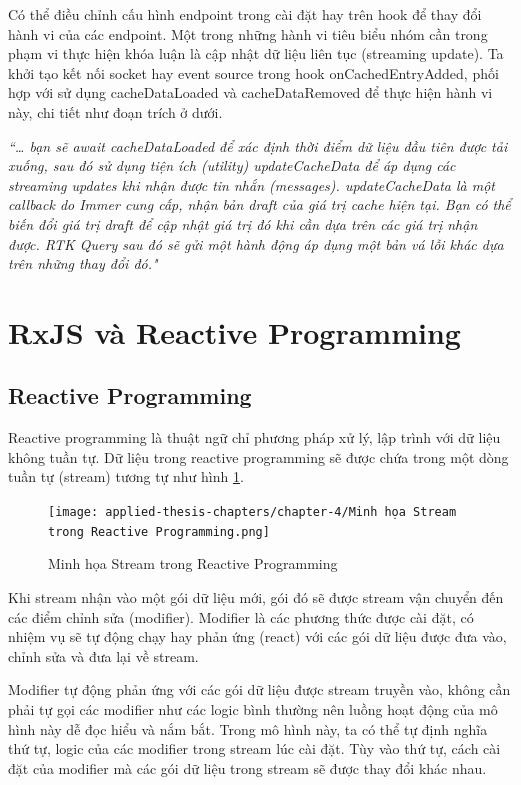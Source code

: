 Có thể điều chỉnh cấu hình endpoint trong cài đặt hay trên hook để thay đổi hành vi của các endpoint.
Một trong những hành vi tiêu biểu nhóm cần trong phạm vi thực hiện khóa luận là cập nhật dữ liệu liên tục (streaming update).
Ta khởi tạo kết nối socket hay event source trong hook onCachedEntryAdded, phối hợp với sử dụng cacheDataLoaded và cacheDataRemoved để thực hiện hành vi này, chi tiết như đoạn trích ở dưới.
\par

\textit{“… bạn sẽ await cacheDataLoaded để xác định thời điểm dữ liệu đầu tiên được tải xuống, sau đó sử dụng tiện ích (utility) updateCacheData để áp dụng các streaming updates khi nhận được tin nhắn (messages).
  updateCacheData là một callback do Immer cung cấp, nhận bản draft của giá trị cache hiện tại.
  Bạn có thể biến đổi giá trị draft để cập nhật giá trị đó khi cần dựa trên các giá trị nhận được.
  RTK Query sau đó sẽ gửi một hành động áp dụng một bản vá lỗi khác dựa trên những thay đổi đó."} \cite{chap4bib3}

\section{RxJS và Reactive Programming}

\subsection{Reactive Programming}

\tab Reactive programming là thuật ngữ chỉ phương pháp xử lý, lập trình với dữ liệu không tuần tự.
Dữ liệu trong reactive programming sẽ được chứa trong một dòng tuần tự (stream) tương tự như hình \ref{fig:StreamInRP}.

\begin{figure}[H]
  \centering
  \texttt{[image: applied-thesis-chapters/chapter-4/Minh họa Stream trong Reactive Programming.png]}
  \caption{Minh họa Stream trong Reactive Programming \cite{chap4bib4}}
  \label{fig:StreamInRP}
\end{figure}

Khi stream nhận vào một gói dữ liệu mới, gói đó sẽ được stream vận chuyển đến các điểm chỉnh sửa (modifier).
Modifier là các phương thức được cài đặt, có nhiệm vụ sẽ tự động chạy hay phản ứng (react) với các gói dữ liệu được đưa vào, chỉnh sửa và đưa lại về stream.
\par

Modifier tự động phản ứng với các gói dữ liệu được stream truyền vào, không cần phải tự gọi các modifier như các logic bình thường nên luồng hoạt động của mô hình này dễ đọc hiểu và nắm bắt.
Trong mô hình này, ta có thể tự định nghĩa thứ tự, logic của các modifier trong stream lúc cài đặt.
Tùy vào thứ tự, cách cài đặt của modifier mà các gói dữ liệu trong stream sẽ được thay đổi khác nhau.

